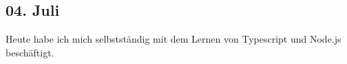 \subsection{04. Juli}
Heute habe ich mich selbstständig mit dem Lernen von Typescript und Node.js beschäftigt.